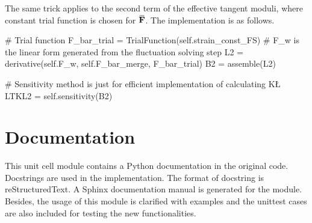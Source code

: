 \documentclass[10pt,a4paper]{scrreprt}
\newcommand{\overbar}[1]{\mkern 1.5mu\overline{\mkern-1.5mu#1\mkern-1.5mu}\mkern 1.5mu}
\begin{document}
The same trick applies to the second term of the effective tangent moduli, where constant trial function is chosen for $\overbar{\mathbf{F}}$. The implementation is as follows. 
\begin{python}
# Trial function
F_bar_trial = TrialFunction(self.strain_const_FS)
# F_w is the linear form generated from the fluctuation solving step
L2 = derivative(self.F_w, self.F_bar_merge, F_bar_trial)
B2 = assemble(L2)

# Sensitivity method is just for efficient implementation of calculating K\L
LTKL2 = self.sensitivity(B2)
\end{python}

\section{Documentation}
This unit cell module contains a Python documentation in the original code. Docstrings are used in the implementation. The format of docstring is reStructuredText. A Sphinx documentation manual is generated for the module. Besides, the usage of this module is clarified with examples and the unittest cases are also included for testing the new functionalities.
\end{document}
